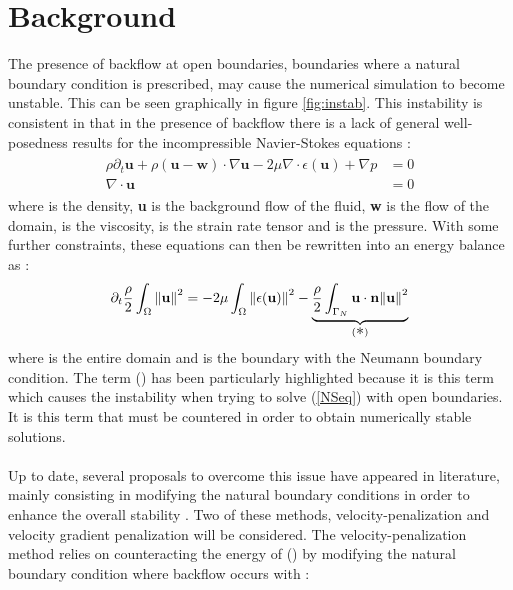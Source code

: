 \section{Background}
The presence of backflow at open boundaries, boundaries where a natural boundary condition is prescribed, may cause the numerical simulation to become unstable. This can be seen graphically in figure \ref{fig:instab}. 
This instability is consistent in that in the presence of backflow there is a lack of general well-posedness results for the incompressible Navier-Stokes equations \cite[slide 24]{bertoglioLec01}: \begin{align}\label{NSeq}\begin{split}
 \rho\partial_t\textbf{u} + \rho(\textbf{u} - \textbf{w})\cdot\nabla\textbf{u} - 2\mu\nabla\cdot\epsilon(\textbf{u}) + \nabla p &= 0 \\ \nabla\cdot\textbf{u} &= 0 
 \end{split}\end{align}
 where \mathm{\rho} is the density, \textbf{u} is the background flow of the fluid, \textbf{w} is the flow of the domain, \mathm{\mu} is the viscosity,  is the strain rate tensor and  is the pressure. With some further constraints, these equations can then be rewritten into an energy balance as \cite[slide 11]{bertoglioLec12}:
 \begin{align}\label{NSeqENergy}
\partial_t\frac{\rho}{2}\int_{\Omega}\norm{\textbf{u}}^2 = -2\mu\int_{\Omega}\norm{\epsilon(\textbf{u})}^2 - \underbrace{\frac{\rho}{2}\int_{\Gamma_{N}}\textbf{u}\cdot\textbf{n}\norm{\textbf{u}}^2}_{(\text{\large \textasteriskcentered})}
 \end{align}
where \mathm{\Omega} is the entire domain and  is the boundary with the Neumann boundary condition. The term ({\large \textasteriskcentered}) has been particularly highlighted because it is this term which causes the instability when trying to solve (\ref{NSeq}) with open boundaries. It is this term that must be countered in order to obtain numerically stable solutions.\\
\\
Up to date, several proposals to overcome this issue have appeared in literature, mainly consisting in modifying the natural boundary conditions in order to enhance the overall stability \cite{bertoglio2017}. Two of these methods, velocity-penalization and velocity gradient penalization will be considered. The velocity-penalization method relies on counteracting the energy of ({\large \textasteriskcentered}) by modifying the natural boundary condition where backflow occurs with \cite[slide 15]{bertoglioLec12}:

